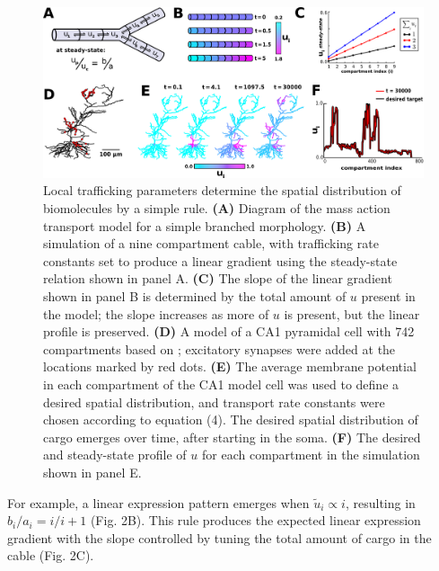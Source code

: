 \documentclass[11pt]{wlpeerj}
\begin{document}
\begin{figure}[!tb]
\begin{center}
\includegraphics[width=0.9\columnwidth]{01_mass_action.png}
\caption{Local trafficking parameters determine the spatial distribution of biomolecules by a simple rule.
\textbf{(A)} Diagram of the mass action transport model for a simple branched morphology.
\textbf{(B)} A simulation of a nine compartment cable, with trafficking rate constants set to produce a linear gradient using the steady-state relation shown in panel A.
\textbf{(C)} The slope of the linear gradient shown in panel B is determined by the total amount of $u$ present in the model; the slope increases as more of $u$ is present, but the linear profile is preserved.
\textbf{(D)} A model of a CA1 pyramidal cell with 742 compartments based on \cite{Migliore_2012}; excitatory synapses were added at the locations marked by red dots. 
\textbf{(E)} The average membrane potential in each compartment of the CA1 model cell was used to define a desired spatial distribution, and transport rate constants were chosen according to equation (4). The desired spatial distribution of cargo emerges over time, after starting in the soma.
\textbf{(F)} The desired and steady-state profile of $u$ for each compartment in the simulation shown in panel E.
}
\end{center}
\end{figure}

For example, a linear expression pattern emerges when $\tilde{u}_i \propto i$, resulting in $b_i / a_i = i / i + 1$ (Fig. 2B).
This rule produces the expected linear expression gradient with the slope controlled by tuning the total amount of cargo in the cable (Fig. 2C).
\end{document}
